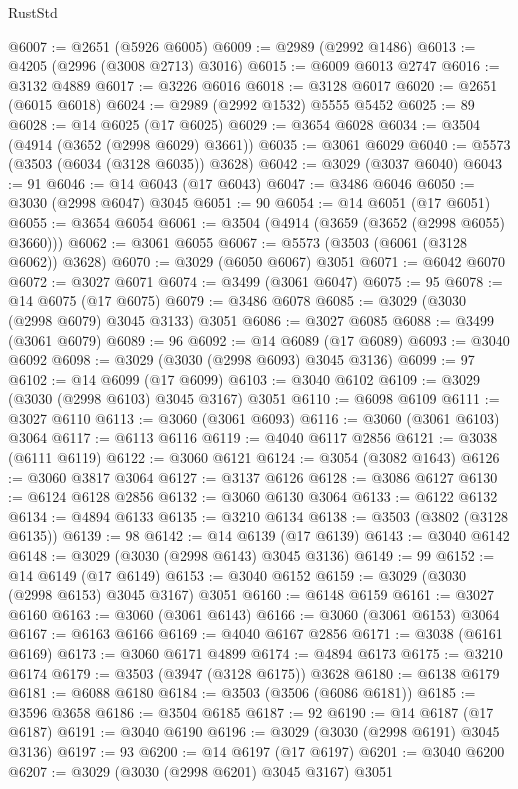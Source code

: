 \begin{lexlean}{RustStd}
\begin{coremodule}
@6007 := @2651 (@5926 @6005)
@6009 := @2989 (@2992 @1486)
@6013 := @4205 (@2996 (@3008 @2713) @3016)
@6015 := @6009 @6013 @2747
@6016 := @3132 @4889
@6017 := @3226 @6016
@6018 := @3128 @6017
@6020 := @2651 (@6015 @6018)
@6024 := @2989 (@2992 @1532) @5555 @5452
@6025 := 89
@6028 := @14 @6025 (@17 @6025)
@6029 := @3654 @6028
@6034 := @3504 (@4914 (@3652 (@2998 @6029) @3661))
@6035 := @3061 @6029
@6040 := @5573 (@3503 (@6034 (@3128 @6035)) @3628)
@6042 := @3029 (@3037 @6040)
@6043 := 91
@6046 := @14 @6043 (@17 @6043)
@6047 := @3486 @6046
@6050 := @3030 (@2998 @6047) @3045
@6051 := 90
@6054 := @14 @6051 (@17 @6051)
@6055 := @3654 @6054
@6061 := @3504 (@4914 (@3659 (@3652 (@2998 @6055) @3660)))
@6062 := @3061 @6055
@6067 := @5573 (@3503 (@6061 (@3128 @6062)) @3628)
@6070 := @3029 (@6050 @6067) @3051
@6071 := @6042 @6070
@6072 := @3027 @6071
@6074 := @3499 (@3061 @6047)
@6075 := 95
@6078 := @14 @6075 (@17 @6075)
@6079 := @3486 @6078
@6085 := @3029 (@3030 (@2998 @6079) @3045 @3133) @3051
@6086 := @3027 @6085
@6088 := @3499 (@3061 @6079)
@6089 := 96
@6092 := @14 @6089 (@17 @6089)
@6093 := @3040 @6092
@6098 := @3029 (@3030 (@2998 @6093) @3045 @3136)
@6099 := 97
@6102 := @14 @6099 (@17 @6099)
@6103 := @3040 @6102
@6109 := @3029 (@3030 (@2998 @6103) @3045 @3167) @3051
@6110 := @6098 @6109
@6111 := @3027 @6110
@6113 := @3060 (@3061 @6093)
@6116 := @3060 (@3061 @6103) @3064
@6117 := @6113 @6116
@6119 := @4040 @6117 @2856
@6121 := @3038 (@6111 @6119)
@6122 := @3060 @6121
@6124 := @3054 (@3082 @1643)
@6126 := @3060 @3817 @3064
@6127 := @3137 @6126
@6128 := @3086 @6127
@6130 := @6124 @6128 @2856
@6132 := @3060 @6130 @3064
@6133 := @6122 @6132
@6134 := @4894 @6133
@6135 := @3210 @6134
@6138 := @3503 (@3802 (@3128 @6135))
@6139 := 98
@6142 := @14 @6139 (@17 @6139)
@6143 := @3040 @6142
@6148 := @3029 (@3030 (@2998 @6143) @3045 @3136)
@6149 := 99
@6152 := @14 @6149 (@17 @6149)
@6153 := @3040 @6152
@6159 := @3029 (@3030 (@2998 @6153) @3045 @3167) @3051
@6160 := @6148 @6159
@6161 := @3027 @6160
@6163 := @3060 (@3061 @6143)
@6166 := @3060 (@3061 @6153) @3064
@6167 := @6163 @6166
@6169 := @4040 @6167 @2856
@6171 := @3038 (@6161 @6169)
@6173 := @3060 @6171 @4899
@6174 := @4894 @6173
@6175 := @3210 @6174
@6179 := @3503 (@3947 (@3128 @6175)) @3628
@6180 := @6138 @6179
@6181 := @6088 @6180
@6184 := @3503 (@3506 (@6086 @6181))
@6185 := @3596 @3658
@6186 := @3504 @6185
@6187 := 92
@6190 := @14 @6187 (@17 @6187)
@6191 := @3040 @6190
@6196 := @3029 (@3030 (@2998 @6191) @3045 @3136)
@6197 := 93
@6200 := @14 @6197 (@17 @6197)
@6201 := @3040 @6200
@6207 := @3029 (@3030 (@2998 @6201) @3045 @3167) @3051

\end{coremodule}
\end{lexlean}
